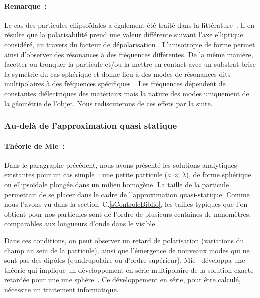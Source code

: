 \paragraph*{Remarque~:} Le cas des particules ellipsoïdales a également été traité dans la littérature~\cite{bohren1983surface}. Il en résulte que la polarisabilité prend une valeur différente suivant l'axe elliptique considéré, au travers du facteur de \og dépolarisation \fg. L'anisotropie de forme permet  ainsi d'observer des résonances à des fréquences différentes. De la même manière, facetter ou tronquer la particule et/ou la mettre en contact avec un substrat brise la symétrie du cas sphérique et donne lieu à des modes de résonances dits \og multipolaires \fg{} à des fréquences spécifiques~\cite{bedeauxbook,lazzari02d,lazzari14b}. Les fréquences dépendent de constantes diélectriques des matériaux mais la nature des modes uniquement de la géométrie de l'objet. Nous rediscuterons de ces effets par la suite.\par 
{}

	\subsubsection{Au-delà de l'approximation quasi statique}
\paragraph*{Théorie de Mie~:}
Dans le paragraphe précédent, nous avons présenté les solutions analytiques existantes pour un cas simple~: une petite particule ($a\ll\lambda$), de forme sphérique ou ellipsoïdale plongée dans un milieu homogène. La taille de la particule permettait de se placer dans le cadre de l'approximation quasi-statique. Comme nous l'avons vu dans la section~C.\ref{sControleBiblio}, les tailles typiques que l'on obtient pour nos particules sont de l'ordre de plusieurs centaines de nanomètres, comparables aux longueurs d'onde dans le visible.\par 
Dans ces conditions, on peut observer un retard de polarisation (variations du champ au sein de la particule), ainsi que l'émergence de nouveaux modes qui ne sont pas des dipôles (quadrupolaire ou d'ordre supérieur). Mie~\cite{mie1908beitrage} développa une théorie qui implique un développement en série multipolaire de la solution exacte retardée pour une une sphère~\cite{kreibig2013optical, bohren1983surface}. Ce développement en série, pour être calculé, nécessite un traitement informatique.\par 
